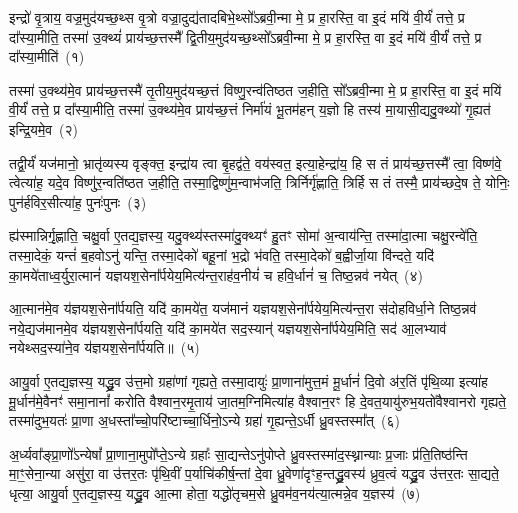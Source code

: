 \setcounter{anuvakam}{0}
इन्द्रो॑ वृ॒त्राय॒ वज्र॒मुद॑यच्छ॒थ्स वृ॒त्रो वज्रा॒दुद्य॑तादबिभे॒थ्सो᳚\-ऽब्रवी॒न्मा मे॒ प्र हा॒रस्ति॒ वा इ॒दं मयि॑ वी॒र्यं॑ तत्ते॒ प्र दा᳚स्या॒मीति॒ तस्मा॑ उ॒क्थ्यं॑ प्राय॑च्छ॒त्तस्मै᳚ द्वि॒तीय॒मुद॑यच्छ॒थ्सो᳚\-ऽब्रवी॒न्मा मे॒ प्र हा॒रस्ति॒ वा इ॒दं मयि॑ वी॒र्यं॑ तत्ते॒ प्र दा᳚स्या॒मीति॑~(१)\ip

तस्मा॑ उ॒क्थ्य॑मे॒व प्राय॑च्छ॒त्तस्मै॑ तृ॒तीय॒मुद॑यच्छ॒त्तं विष्णु॒रन्व॑तिष्ठत ज॒हीति॒ सो᳚\-ऽब्रवी॒न्मा मे॒ प्र हा॒रस्ति॒ वा इ॒दं मयि॑ वी॒र्यं॑ तत्ते॒ प्र दा᳚स्या॒मीति॒ तस्मा॑ उ॒क्थ्य॑मे॒व प्राय॑च्छ॒त्तं निर्मा॑यं भू॒तम॑हन् य॒ज्ञो हि तस्य॑ मा॒यासी॒द्यदु॒क्थ्यो॑ गृ॒ह्यत॑ इन्द्रि॒यमे॒व~(२)\ip

तद्वी॒र्यं॑ यज॑मानो॒ भ्रातृ॑व्यस्य वृङ्क्त॒ इन्द्रा॑य त्वा बृ॒हद्व॑ते॒ वय॑स्वत॒ इत्या॒हेन्द्रा॑य॒ हि स तं प्राय॑च्छ॒त्तस्मै᳚ त्वा॒ विष्ण॑वे॒ त्वेत्या॑ह॒ यदे॒व विष्णु॑र॒न्वति॑ष्ठत ज॒हीति॒ तस्मा॒द्विष्णु॑म॒न्वाभ॑जति॒ त्रिर्निर्गृ॑ह्णाति॒ त्रिर्\mbox{}हि स तं तस्मै॒ प्राय॑च्छदे॒ष ते॒ योनिः॒ पुन॑र्\mbox{}हविर॒सीत्या॑ह॒ पुनः॑पुनः~(३)\ip

ह्य॑स्मान्निर्गृ॒ह्णाति॒ चक्षु॒र्वा ए॒तद्य॒ज्ञस्य॒ यदु॒क्थ्य॑स्तस्मा॑दु॒क्थ्यꣳ॑ हु॒तꣳ सोमा॑ अ॒न्वाय॑न्ति॒ तस्मा॑दा॒त्मा चक्षु॒रन्वे॑ति॒ तस्मा॒देकं॒ यन्तं॑ ब॒हवो\-ऽनु॑ यन्ति॒ तस्मा॒देको॑ बहू॒नां भ॒द्रो भ॑वति॒ तस्मा॒देको॑ ब॒ह्वीर्जा॒या वि॑न्दते॒ यदि॑ का॒मये॑ताध्व॒र्युरा॒त्मानं॑ यज्ञयश॒सेना᳚र्पयेय॒मित्य॑न्त॒राह॑व॒नीयं॑ च हवि॒र्धानं॑ च॒ तिष्ठ॒न्नव॑ नयेत्~(४)\ip

आ॒त्मान॑मे॒व य॑ज्ञयश॒सेना᳚र्पयति॒ यदि॑ का॒मये॑त॒ यज॑मानं यज्ञयश॒सेना᳚र्पयेय॒मित्य॑न्त॒रा स॑दोहविर्धा॒ने तिष्ठ॒न्नव॑ नये॒द्यज॑मानमे॒व य॑ज्ञयश॒सेना᳚र्पयति॒ यदि॑ का॒मये॑त सद॒स्यान्॑ यज्ञयश॒सेना᳚र्पयेय॒मिति॒ सद॑ आ॒लभ्याव॑ नयेथ्सद॒स्या॑ने॒व य॑ज्ञयश॒सेना᳚र्पयति॥~(५)\ip

{\anuvakamend[{इती᳚न्द्रि॒यमे॒व पुनः॑पुनर्नये॒त्त्रय॑स्त्रिꣳशच्च}]}

आयु॒र्वा ए॒तद्य॒ज्ञस्य॒ यद्ध्रु॒व उ॑त्त॒मो ग्रहा॑णां गृह्यते॒ तस्मा॒दायुः॑ प्रा॒णाना॑मुत्त॒मं मू॒र्धानं॑ दि॒वो अ॑र॒तिं पृ॑थि॒व्या इत्या॑ह मू॒र्धान॑मे॒वैनꣳ॑ समा॒नानां᳚ करोति वैश्वान॒रमृ॒ताय॑ जा॒तम॒ग्निमित्या॑ह वैश्वान॒रꣳ हि दे॒वत॒यायु॑रुभ॒यतो॑वैश्वानरो गृह्यते॒ तस्मा॑दुभ॒यतः॑ प्रा॒णा अ॒धस्ता᳚च्चो॒परि॑ष्टाच्चा॒र्धिनो॒\-ऽन्ये ग्रहा॑ गृ॒ह्यन्ते॒\-ऽर्धी ध्रु॒वस्तस्मा᳚त्~(६)\ip

अ॒र्ध्यवा᳚ङ्प्रा॒णो᳚\-ऽन्येषां᳚ प्रा॒णाना॒मुपो᳚प्ते॒\-ऽन्ये ग्रहाः᳚ सा॒द्यन्ते\-ऽनु॑पोप्ते ध्रु॒वस्तस्मा॑द॒स्थ्नान्याः प्र॒जाः प्र॑ति॒तिष्ठ॑न्ति मा॒ꣳ॒सेना॒न्या असु॑रा॒ वा उ॑त्तर॒तः पृ॑थि॒वीं प॒र्याचि॑कीर्\mbox{}ष॒न्तां दे॒वा ध्रु॒वेणा॑दृꣳह॒न्तद्ध्रु॒वस्य॑ ध्रुव॒त्वं यद्ध्रु॒व उ॑त्तर॒तः सा॒द्यते॒ धृत्या॒ आयु॒र्वा ए॒तद्य॒ज्ञस्य॒ यद्ध्रु॒व आ॒त्मा होता॒ यद्धो॑तृचम॒से ध्रु॒वम॑व॒नय॑त्या॒त्मन्ने॒व य॒ज्ञस्य॑~(७)\ip

